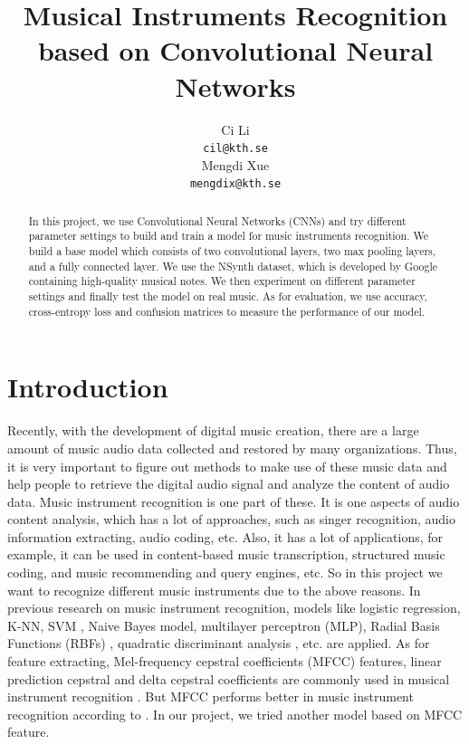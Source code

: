 \documentclass{article}
\title{Musical Instruments Recognition based on Convolutional Neural Networks}
\author{
  Ci Li\\
  \texttt{cil@kth.se} \\
  \And
  Mengdi Xue \\
  \texttt{mengdix@kth.se} \\
}
\begin{document}

\maketitle

\begin{abstract}
  In this project, we use Convolutional Neural Networks (CNNs) and try different parameter settings to build and train a model for music instruments recognition. We build a base model which consists of two convolutional layers, two max pooling layers, and a fully connected layer. We use the NSynth dataset, which is developed by Google containing high-quality musical notes. We then experiment on different parameter settings and finally test the model on real music. As for evaluation, we use accuracy, cross-entropy loss and confusion matrices to measure the performance of our model. 
\end{abstract}

\section{Introduction}

Recently, with the development of digital music creation, there are a large amount of music audio data collected and restored by many organizations. Thus, it is very important to figure out methods to make use of these music data and help people to retrieve the digital audio signal and analyze the content of audio data. Music instrument recognition is one part of these. It is one aspects of audio content analysis, which has a lot of approaches, such as singer recognition, audio information extracting, audio coding, etc. Also, it has a lot of applications, for example, it can be used in content-based music transcription, structured music coding, and music recommending and query engines, etc. So in this project we want to recognize different music instruments due to the above reasons. In previous research on music instrument recognition, models like logistic regression, K-NN, SVM \cite{sell}, Naive Bayes model, multilayer perceptron (MLP), Radial Basis Functions (RBFs) \cite{deng}, quadratic discriminant analysis \cite{agostini}, etc. are applied. As for feature extracting, Mel-frequency cepstral coefficients (MFCC) features, linear prediction cepstral and delta cepstral coefficients are commonly used in musical instrument recognition . But MFCC performs better in music instrument recognition according to \cite{eronen}. In our project, we tried another model based on MFCC feature.
\end{document}
